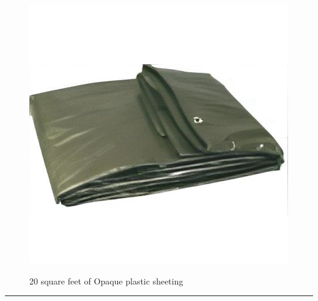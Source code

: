 \documentclass{article}
\begin{document}
    \begin{figure}[H]
        \centering
        \begin{minipage}{0.25\textwidth}
            \centering
            \includegraphics[width=\textwidth]{../SurvivalItemImages/plasticsheeting}
        \end{minipage}\hfill
        \begin{minipage}{0.7\textwidth}
            \centering
            \Large 20 square feet of Opaque plastic sheeting
        \end{minipage}
    \end{figure}
    \vspace{-0.8em}
    \noindent\rule{\textwidth}{0.4pt}
            
    \clearpage
\end{document}
